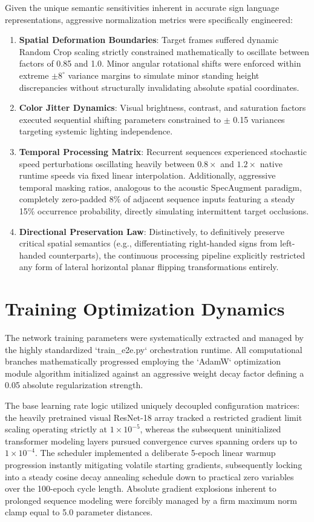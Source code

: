 Given the unique semantic sensitivities inherent in accurate sign language representations, aggressive normalization metrics were specifically engineered:
\begin{enumerate}
    \item \textbf{Spatial Deformation Boundaries}: Target frames suffered dynamic Random Crop scaling strictly constrained mathematically to oscillate between factors of 0.85 and 1.0. Minor angular rotational shifts were enforced within extreme $\pm 8^{\circ}$ variance margins to simulate minor standing height discrepancies without structurally invalidating absolute spatial coordinates.
    \item \textbf{Color Jitter Dynamics}: Visual brightness, contrast, and saturation factors executed sequential shifting parameters constrained to $\pm$ 0.15 variances targeting systemic lighting independence.
    \item \textbf{Temporal Processing Matrix}: Recurrent sequences experienced stochastic speed perturbations oscillating heavily between $0.8\times$ and $1.2\times$ native runtime speeds via fixed linear interpolation. Additionally, aggressive temporal masking ratios, analogous to the acoustic SpecAugment paradigm, completely zero-padded 8\% of adjacent sequence inputs featuring a steady 15\% occurrence probability, directly simulating intermittent target occlusions.
    \item \textbf{Directional Preservation Law}: Distinctively, to definitively preserve critical spatial semantics (e.g., differentiating right-handed signs from left-handed counterparts), the continuous processing pipeline explicitly restricted any form of lateral horizontal planar flipping transformations entirely. 
\end{enumerate}

\section{Training Optimization Dynamics}

The network training parameters were systematically extracted and managed by the highly standardized `train\_e2e.py` orchestration runtime. All computational branches mathematically progressed employing the `AdamW` optimization module algorithm initialized against an aggressive weight decay factor defining a 0.05 absolute regularization strength.

The base learning rate logic utilized uniquely decoupled configuration matrices: the heavily pretrained visual ResNet-18 array tracked a restricted gradient limit scaling operating strictly at $1 \times 10^{-5}$, whereas the subsequent uninitialized transformer modeling layers pursued convergence curves spanning orders up to $1 \times 10^{-4}$. The scheduler implemented a deliberate 5-epoch linear warmup progression instantly mitigating volatile starting gradients, subsequently locking into a steady cosine decay annealing schedule down to practical zero variables over the 100-epoch cycle length. Absolute gradient explosions inherent to prolonged sequence modeling were forcibly managed by a firm maximum norm clamp equal to 5.0 parameter distances.

